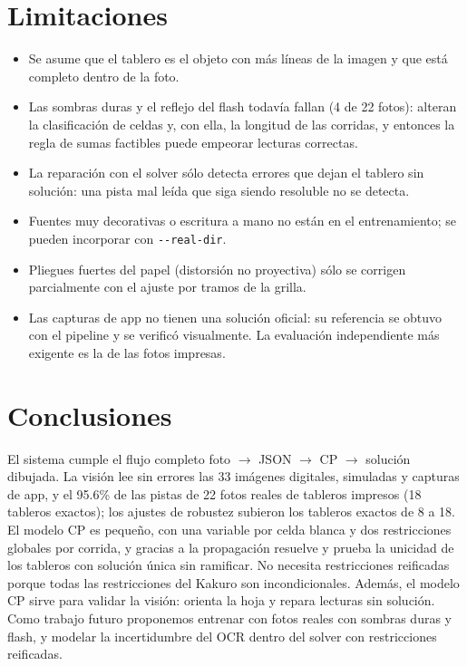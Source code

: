 \documentclass[conference,a4paper]{IEEEtran}
\begin{document}
\section{Limitaciones}
\begin{itemize}
  \item Se asume que el tablero es el objeto con más líneas de la imagen y que está completo dentro de la foto.
  \item Las sombras duras y el reflejo del flash todavía fallan (4 de 22 fotos): alteran la clasificación de celdas y, con ella, la
        longitud de las corridas, y entonces la regla de sumas factibles puede empeorar lecturas correctas.
  \item La reparación con el solver sólo detecta errores que dejan el tablero sin solución: una pista mal leída que siga siendo
        resoluble no se detecta.
  \item Fuentes muy decorativas o escritura a mano no están en el entrenamiento; se pueden incorporar con \texttt{-{}-real-dir}.
  \item Pliegues fuertes del papel (distorsión no proyectiva) sólo se corrigen parcialmente con el ajuste por tramos de la grilla.
  \item Las capturas de app no tienen una solución oficial: su referencia se obtuvo con el pipeline y se verificó visualmente. La
        evaluación independiente más exigente es la de las fotos impresas.
\end{itemize}

\section{Conclusiones}
El sistema cumple el flujo completo foto $\rightarrow$ JSON $\rightarrow$ CP $\rightarrow$ solución dibujada. La visión lee sin errores
las 33 imágenes digitales, simuladas y capturas de app, y el 95.6\% de las pistas de 22 fotos reales de tableros impresos (18 tableros
exactos); los ajustes de robustez subieron los tableros exactos de 8 a 18. El modelo CP es pequeño, con una variable por celda blanca y
dos restricciones globales por corrida, y gracias a la propagación resuelve y prueba la unicidad de los tableros con solución única sin
ramificar. No necesita restricciones reificadas porque todas las restricciones del Kakuro son incondicionales. Además, el modelo CP sirve
para validar la visión: orienta la hoja y repara lecturas sin solución. Como trabajo futuro proponemos entrenar con fotos reales con
sombras duras y flash, y modelar la incertidumbre del OCR dentro del solver con restricciones reificadas.
\end{document}
